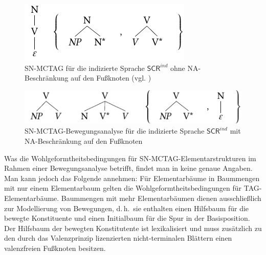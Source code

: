 \begin{figure}[t]
\centering
\includegraphics{graphics/abb617.pdf}
\caption{SN-MCTAG für die indizierte Sprache $\mathsf{SCR}^{ind}$ ohne NA-Beschränkung auf den Fu\ss knoten (vgl. \citealt[Figure~5]{Kallmeyer:05})\label{fig-snmctag-3}} 
\end{figure}

\begin{figure}[t]
\centering
\includegraphics{graphics/abb618.pdf}
\caption{SN-MCTAG-Bewegungsanalyse für die indizierte Sprache $\mathsf{SCR}^{ind}$  mit NA-Beschränkung auf den Fu\ss knoten\label{fig-snmctag-4}}
\end{figure}

Was die Wohlgeformtheitsbedingungen für SN-MCTAG-Elementarstrukturen im Rahmen einer Bewegungsanalyse betrifft, findet man in \cite{Kallmeyer:05} keine genaue Angaben. Man kann jedoch das Folgende annehmen: Für Elementarbäume in Baummengen mit nur einem Elementarbaum gelten die Wohlgeformtheitsbedingungen für TAG-Elementarbäume. Baummengen mit mehr Elementarbäumen dienen ausschlie\ss lich zur Modellierung von Bewegungen, d.\,h.\ sie enthalten einen Hilfsbaum für die bewegte Konstituente und einen Initialbaum für die Spur in der Basisposition. Der Hilfsbaum der bewegten Konstitutente ist lexikalisiert und muss zusätzlich zu den durch das Valenzprinzip lizenzierten nicht-terminalen Blättern einen valenzfreien Fu\ss knoten besitzen.%

